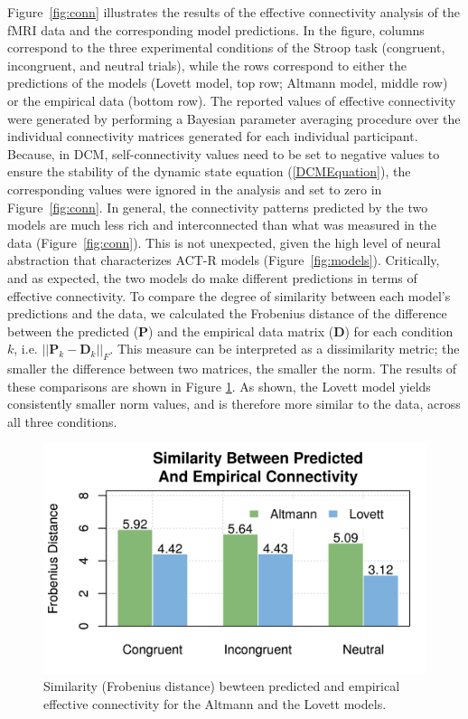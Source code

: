 \documentclass[10pt,letterpaper]{article}
\newcommand{\mat}[1]{\boldsymbol{#1}} %
\begin{document}
Figure~\ref{fig:conn} illustrates the results of the effective connectivity analysis of the fMRI data and the corresponding model predictions. In the figure, columns correspond to the three experimental conditions of the Stroop task (congruent, incongruent, and neutral trials), while the rows correspond to either the predictions of the models (Lovett model, top row; Altmann model, middle row) or the empirical data (bottom row). The reported values of effective connectivity were generated by performing a Bayesian parameter averaging procedure \cite{Kasess2010} over the individual connectivity matrices generated for each individual participant. Because, in DCM, self-connectivity values need to be set to negative values to ensure the stability of the dynamic state equation (\ref{DCMEquation}), the corresponding values were ignored in the analysis and set to zero in Figure~\ref{fig:conn}.
In general, the connectivity patterns predicted by the two models are much less rich and interconnected than what was measured in the data (Figure~\ref{fig:conn}). This is not unexpected, given the high level of neural abstraction that characterizes ACT-R models (Figure~\ref{fig:models}). Critically, and as expected, the two models do make different predictions in terms of effective connectivity. To compare the degree of similarity between each model's predictions and the data, we calculated the Frobenius distance of the difference between the predicted ($\mat{P}$) and the empirical data matrix ($\mat{D}$) for each condition $k$, i.e. $||\mat{P}_k - \mat{D}_k||_F$. This measure can be interpreted as a dissimilarity metric; the smaller the difference between two matrices, the smaller the norm. The results of these comparisons are shown in Figure \ref{fig:results}. As shown, the Lovett model yields consistently smaller norm values, and is therefore more similar to the data, across all three conditions. 

\begin{figure}[h]
\centering
 \includegraphics[width=\linewidth]{frobenius.png}
\caption{Similarity (Frobenius distance) bewteen predicted and empirical effective connectivity for the Altmann and the Lovett models.}
\label{fig:results}
\end{figure}%
\end{document}
